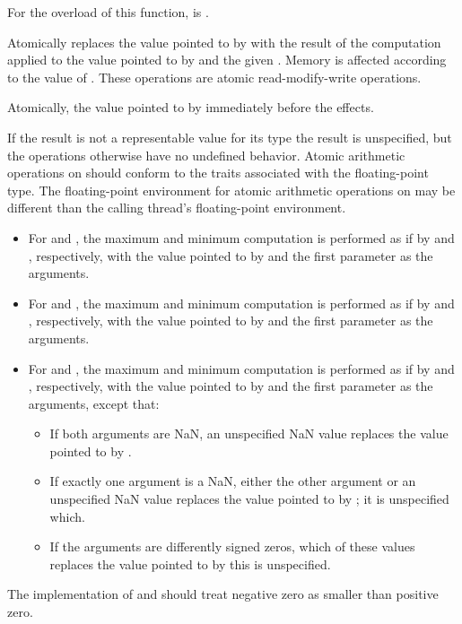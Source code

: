 \begin{itemdescr}
\pnum
\constraints
For the  overload of this function,
 is .

\pnum
\effects
Atomically replaces the value pointed to by 
with the result of the computation applied to the value pointed
to by  and the given .
Memory is affected according to the value of .
These operations are atomic read-modify-write operations.

\pnum
\returns
Atomically, the value pointed to by  immediately before the effects.

\pnum
\remarks
If the result is not a representable value for its type
the result is unspecified, but the operations otherwise have no undefined
behavior. Atomic arithmetic operations on 
should conform to the 
traits associated with the floating-point type.
The floating-point environment for atomic arithmetic operations
on  may be different than the
calling thread's floating-point environment.

\pnum
\begin{itemize}
\item
For  and ,
the maximum and minimum computation is performed
as if by  and , respectively,
with the value pointed to by  and the first parameter
as the arguments.
\item
For  and ,
the maximum and minimum computation is performed
as if by  and , respectively,
with the value pointed to by  and the first parameter
as the arguments.
\item
For  and ,
the maximum and minimum computation is performed
as if by  and , respectively,
with the value pointed to by  and the first parameter
as the arguments, except that:
\begin{itemize}
\item
If both arguments are NaN,
an unspecified NaN value replaces the value pointed to by .
\item
If exactly one argument is a NaN,
either the other argument or an unspecified NaN value
replaces the value pointed to by ; it is unspecified which.
\item
If the arguments are differently signed zeros,
which of these values replaces the value pointed to by this is unspecified.
\end{itemize}
\end{itemize}

\pnum
\recommended
The implementation of  and 
should treat negative zero as smaller than positive zero.
\end{itemdescr}


